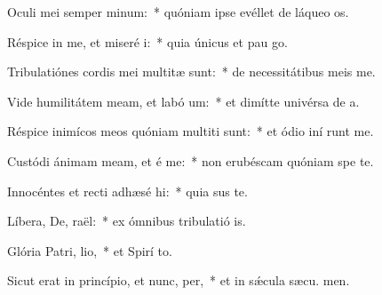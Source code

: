 \item Oculi mei semper  minum:~* quóniam ipse evéllet de láqueo  os.
\item Réspice in me, et miseré i:~* quia únicus et pau  go.
\item Tribulatiónes cordis mei multitæ sunt:~* de necessitátibus meis  me.
\item Vide humilitátem meam, et labó um:~* et dimítte univérsa de a.
\item Réspice inimícos meos quóniam multiti sunt:~* et ódio iní runt me.
\item Custódi ánimam meam, et é me:~* non erubéscam quóniam spe  te.
\item Innocéntes et recti adhæsé hi:~* quia sus te.
\item Líbera, De, raël:~* ex ómnibus tribulatió is.
\item Glória Patri,  lio,~* et Spirí to.
\item Sicut erat in princípio, et nunc,  per,~* et in sǽcula sæcu. men.

